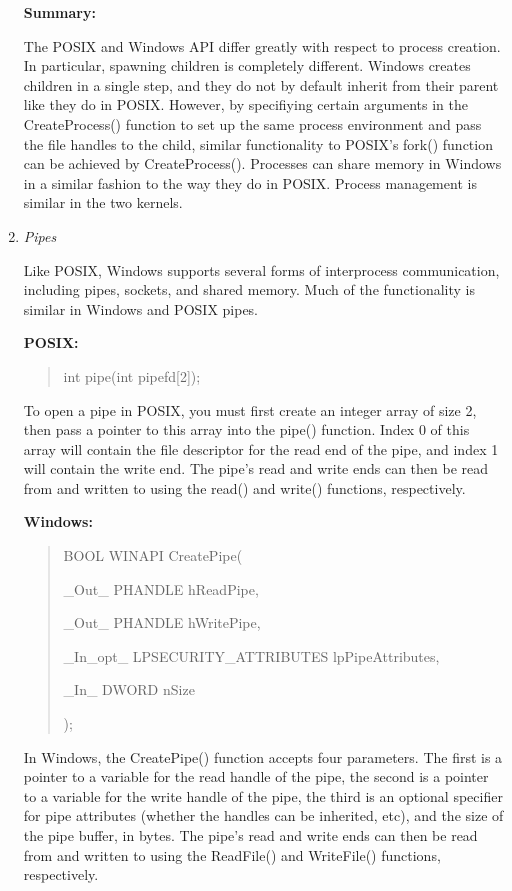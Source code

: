 \documentclass[letterpaper,10pt,titlepage]{article}
\newcommand{\tab}{\hspace*{2em}} %
\begin{document}
\begin{enumerate}
\textbf{Summary:} \newline

The POSIX and Windows API differ greatly with respect to process creation. In particular, spawning children is completely different. Windows creates children in a single step, and they do not by default inherit from their parent like they do in POSIX. However, by specifiying certain arguments in the CreateProcess() function to set up the same process environment and pass the file handles to the child, similar functionality to POSIX's fork() function can be achieved by CreateProcess(). Processes can share memory in Windows in a similar fashion to the way they do in POSIX. Process management is similar in the two kernels. \newline

\item \emph{Pipes}

\tab Like POSIX, Windows supports several forms of interprocess communication, including pipes, sockets, and shared memory. Much of the functionality is similar in Windows and POSIX pipes. \newline

\textbf{POSIX:}

\begin{quote}
int pipe(int pipefd[2]);
\end{quote}

To open a pipe in POSIX, you must first create an integer array of size 2, then pass a pointer to this array into the pipe() function. Index 0 of this array will contain the file descriptor for the read end of the pipe, and index 1 will contain the write end. The pipe's read and write ends can then be read from and written to using the read() and write() functions, respectively.  \newline

\textbf{Windows:} 

\begin{quote}
BOOL WINAPI CreatePipe(

\tab\_Out\_     PHANDLE hReadPipe,

\tab\_Out\_     PHANDLE hWritePipe,

\tab\_In\_opt\_  LPSECURITY\_ATTRIBUTES lpPipeAttributes,

\tab\_In\_      DWORD nSize

);
\end{quote}

\tab In Windows, the CreatePipe() function accepts four parameters. The first is a pointer to a variable for the read handle of the pipe, the second is a pointer to a variable for the write handle of the pipe, the third is an optional specifier for pipe attributes (whether the handles can be inherited, etc), and the size of the pipe buffer, in bytes. The pipe's read and write ends can then be read from and written to using the ReadFile() and WriteFile() functions, respectively. \newline


\end{enumerate}
\end{document}
